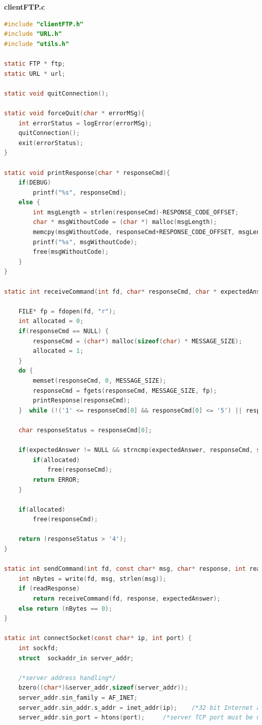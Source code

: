 \documentclass[a4paper, 11pt]{article}
\begin{document}
\huge\textbf{clientFTP.c}
\begin{lstlisting}[language=C]
#include "clientFTP.h"
#include "URL.h"
#include "utils.h"

static FTP * ftp;
static URL * url;

static void quitConnection();

static void forceQuit(char * errorMSg){
	int errorStatus = logError(errorMSg);
	quitConnection();
	exit(errorStatus);
}

static void printResponse(char * responseCmd){
  	if(DEBUG)
    	printf("%s", responseCmd);
  	else {
    	int msgLength = strlen(responseCmd)-RESPONSE_CODE_OFFSET;
   		char * msgWithoutCode = (char *) malloc(msgLength);
    	memcpy(msgWithoutCode, responseCmd+RESPONSE_CODE_OFFSET, msgLength+1);
    	printf("%s", msgWithoutCode);
    	free(msgWithoutCode);
  	}
}

static int receiveCommand(int fd, char* responseCmd, char * expectedAnswer) {

	FILE* fp = fdopen(fd, "r");
	int allocated = 0;
	if(responseCmd == NULL) {
		responseCmd = (char*) malloc(sizeof(char) * MESSAGE_SIZE);
		allocated = 1;
	}
	do {
		memset(responseCmd, 0, MESSAGE_SIZE);
		responseCmd = fgets(responseCmd, MESSAGE_SIZE, fp);
		printResponse(responseCmd);
	}  while (!('1' <= responseCmd[0] && responseCmd[0] <= '5') || responseCmd[3] != ' ');

	char responseStatus = responseCmd[0];

	if(expectedAnswer != NULL && strncmp(expectedAnswer, responseCmd, strlen(expectedAnswer))){
		if(allocated)
			free(responseCmd);
		return ERROR;
	}

	if(allocated)
		free(responseCmd);

	return (responseStatus > '4');
}

static int sendCommand(int fd, const char* msg, char* response, int readResponse, char * expectedAnswer) {
	int nBytes = write(fd, msg, strlen(msg));
	if (readResponse) 
		return receiveCommand(fd, response, expectedAnswer);
	else return (nBytes == 0);
}

static int connectSocket(const char* ip, int port) {
	int	sockfd;
	struct	sockaddr_in server_addr;

	/*server address handling*/
	bzero((char*)&server_addr,sizeof(server_addr));
	server_addr.sin_family = AF_INET;
	server_addr.sin_addr.s_addr = inet_addr(ip);	/*32 bit Internet address network byte ordered*/
	server_addr.sin_port = htons(port);		/*server TCP port must be network byte ordered */


\end{lstlisting}
\end{document}
